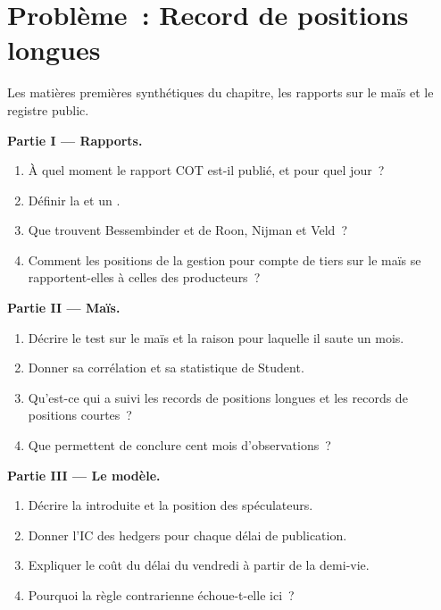 \section{Problème~: Record de positions longues}

\begin{problem}\label{pb:s1:positioning-and-sentiment:1}
Les matières premières synthétiques du chapitre, les rapports sur le maïs et le registre public.

\medskip\noindent\textbf{Partie I --- Rapports.}
\begin{enumerate}
\item À quel moment le rapport COT est-il publié, et pour quel jour~?
\item Définir la  et un .
\item Que trouvent Bessembinder et de Roon, Nijman et Veld~?
\item Comment les positions de la gestion pour compte de tiers sur le maïs se rapportent-elles à celles des producteurs~?
\end{enumerate}

\medskip\noindent\textbf{Partie II --- Maïs.}
\begin{enumerate}[resume]
\item Décrire le test sur le maïs et la raison pour laquelle il saute un mois.
\item Donner sa corrélation et sa statistique de Student.
\item Qu'est-ce qui a suivi les records de positions longues et les records de positions courtes~?
\item Que permettent de conclure cent mois d'observations~?
\end{enumerate}

\medskip\noindent\textbf{Partie III --- Le modèle.}
\begin{enumerate}[resume]
\item Décrire la  introduite et la position des spéculateurs.
\item Donner l'IC des hedgers pour chaque délai de publication.
\item Expliquer le coût du délai du vendredi à partir de la demi-vie.
\item Pourquoi la règle contrarienne échoue-t-elle ici~?
\end{enumerate}


\end{problem}

